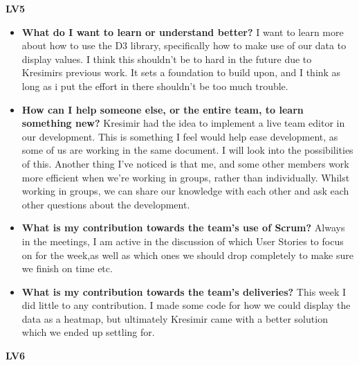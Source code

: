 \documentclass[]{article}
\begin{document}
\textbf{\huge{LV5}}

\begin{itemize}
    \item \textbf{What do I want to learn or understand better?} \newline
    I want to learn more about how to use the D3 library, specifically how to make use of our data to display values. I think this shouldn't be to hard in the future due to Kresimirs previous work. It sets a foundation to build upon, and I think as long as i put the effort in there shouldn't be too much trouble.
    
    \item \textbf{How can I help someone else, or the entire team, to learn something new?} \newline
    Kresimir had the idea to implement a live team editor in our development. This is something I feel would help ease development, as some of us are working in the same document. I will look into the possibilities of this. Another thing I've noticed is that me, and some other members work more efficient when we're working in groups, rather than individually. Whilst working in groups, we can share our knowledge with each other and ask each other questions about the development.
    
    \item \textbf{What is my contribution towards the team’s use of Scrum?} \newline
    Always in the meetings, I am active in the discussion of which User Stories to focus on for the week,as well as which ones we should drop completely to make sure we finish on time etc.
    
    \item \textbf{What is my contribution towards the team’s deliveries?} \newline
    This week I did little to any contribution. I made some code for how we could display the data as a heatmap, but ultimately Kresimir came with a better solution which we ended up settling for.
    
\end{itemize}

\newpage

\textbf{\huge{LV6}}
\end{document}
